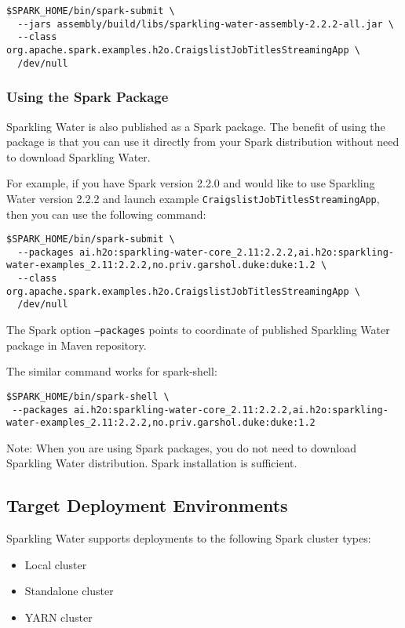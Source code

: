 \pagebreak
\begin{lstlisting}[style=Bash]
$SPARK_HOME/bin/spark-submit \
  --jars assembly/build/libs/sparkling-water-assembly-2.2.2-all.jar \
  --class org.apache.spark.examples.h2o.CraigslistJobTitlesStreamingApp \
  /dev/null
\end{lstlisting}

\subsubsection{Using the Spark Package}

Sparkling Water is also published as a Spark package. The benefit of using the package is that you can use it directly from your Spark distribution without need to download Sparkling Water.

For example, if you have Spark version 2.2.0 and would like to use Sparkling Water version 2.2.2 and launch example \texttt{CraigslistJobTitlesStreamingApp}, then you can use the following command:

\begin{lstlisting}[style=Bash]
$SPARK_HOME/bin/spark-submit \
  --packages ai.h2o:sparkling-water-core_2.11:2.2.2,ai.h2o:sparkling-water-examples_2.11:2.2.2,no.priv.garshol.duke:duke:1.2 \
  --class org.apache.spark.examples.h2o.CraigslistJobTitlesStreamingApp \
  /dev/null
\end{lstlisting}

The Spark option \texttt{--packages} points to coordinate of published Sparkling Water package in Maven repository.

The similar command works for spark-shell:

\begin{lstlisting}[style=Bash]
$SPARK_HOME/bin/spark-shell \
 --packages ai.h2o:sparkling-water-core_2.11:2.2.2,ai.h2o:sparkling-water-examples_2.11:2.2.2,no.priv.garshol.duke:duke:1.2
\end{lstlisting}

Note: When you are using Spark packages, you do not need to download Sparkling Water distribution. Spark installation is sufficient.

\newpage
\subsection{Target Deployment Environments}
Sparkling Water supports deployments to the following Spark cluster types:
\begin{itemize}
	\item{Local cluster}
	\item{Standalone cluster} 
	\item{YARN cluster}
\end{itemize}

